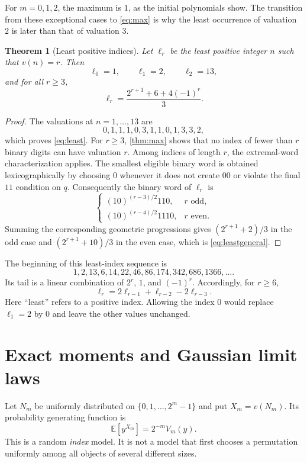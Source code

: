 \documentclass[11pt]{article}
\newtheorem{theorem}{Theorem}[section]
\theoremstyle{definition}\newtheorem{definition}[theorem]{Definition}
\theoremstyle{remark}\newtheorem{remark}[theorem]{Remark}
\newcommand{\E}{\mathbb E}
\begin{document}
For $m=0,1,2$, the maximum is $1$, as the initial polynomials show.
The transition from these exceptional cases to \eqref{eq:max} is why
the least occurrence of valuation $2$ is later than that of valuation
$3$.

\begin{theorem}[Least positive indices]\label{thm:least}
Let $\ell_r$ be the least positive integer $n$ such that $v(n)=r$.
Then
\begin{equation}\label{eq:least}
 \ell_0=1,\qquad\ell_1=2,\qquad\ell_2=13,
\end{equation}
and for all $r\geq3$,
\begin{equation}\label{eq:leastgeneral}
 \boxed{\ \ell_r=\frac{2^{r+1}+6+4(-1)^r}{3}.\ }
\end{equation}
\end{theorem}
\begin{proof}
The valuations at $n=1,\ldots,13$ are
\[
 0,1,1,1,0,3,1,1,0,1,3,3,2,
\]
which proves \eqref{eq:least}. For $r\geq3$, \cref{thm:max} shows that
no index of fewer than $r$ binary digits can have valuation $r$.
Among indices of length $r$, the extremal-word characterization applies.
The smallest eligible binary word is obtained lexicographically by
choosing $0$ whenever it does not create $00$ or violate the final $11$
condition on $q$. Consequently the binary word of $\ell_r$ is
\[
 \begin{cases}
 (10)^{(r-3)/2}110,&r\text{ odd},\\
 (10)^{(r-4)/2}1110,&r\text{ even}.
 \end{cases}
\]
Summing the corresponding geometric progressions gives
$(2^{r+1}+2)/3$ in the odd case and $(2^{r+1}+10)/3$ in the even case,
which is \eqref{eq:leastgeneral}.
\end{proof}

The beginning of this least-index sequence is
\[
 1,2,13,6,14,22,46,86,174,342,686,1366,\ldots.
\]
Its tail is a linear combination of $2^r$, $1$, and $(-1)^r$.
Accordingly, for $r\geq6$,
\[
 \ell_r=2\ell_{r-1}+\ell_{r-2}-2\ell_{r-3}.
\]
Here ``least'' refers to a positive index. Allowing the index $0$ would
replace $\ell_1=2$ by $0$ and leave the other values unchanged.

\section{Exact moments and Gaussian limit laws}\label{sec:limit}

Let $N_m$ be uniformly distributed on $\{0,1,\ldots,2^m-1\}$ and put
$X_m=v(N_m)$. Its probability generating function is
\begin{equation}\label{eq:pgf}
 \E[y^{X_m}]=2^{-m}V_m(y).
\end{equation}
This is a random \emph{index} model. It is not a model that first chooses
a permutation uniformly among all objects of several different sizes.
\end{document}
